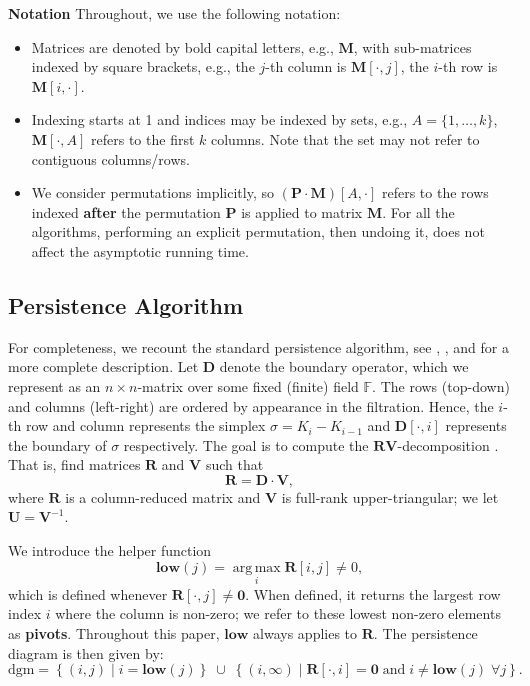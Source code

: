 \documentclass[10pt,a4paper]{article}
\newcommand{\field}{\mathbb{F}}
\newcommand{\matsize}[2]{#1\times #2}
\newcommand{\dgm}{\mathrm{dgm}}
\newcommand{\mat}[1]{\mathbf{#1}}
\newcommand{\bdr}{\mat{D}}
\newcommand{\low}{\mathbf{low}}
\DeclareMathOperator*{\argmax}{arg\,max}
\begin{document}
\vspace{0.2cm}
\noindent\textbf{Notation}
Throughout, we use the following notation:
\begin{itemize}
\item Matrices are denoted by bold capital letters, e.g., $\mat{M}$, with sub-matrices indexed by square brackets, e.g., the $j$-th column is $\mat{M}[\cdot,j]$, the $i$-th row is $\mat{M}[i, \cdot]$. 
\item Indexing starts at 1 and indices may be indexed by sets, e.g., $A = \{1,\ldots,k\}$, $\mat{M}[\cdot,A]$ refers to the first $k$ columns. Note that the set may not refer to contiguous columns/rows.
\item We consider permutations implicitly, so $(\mat{P}\cdot\mat{M})[A,\cdot]$ refers to the rows indexed \textbf{after} the permutation $\mat{P}$ is applied to matrix $\mat{M}$. For all the algorithms, performing an explicit permutation, then undoing it, does not affect the asymptotic running time. %
\end{itemize}

\subsection{Persistence Algorithm}

For completeness, we recount the standard persistence algorithm, see \cite{edelsbrunner2002topological}, \cite{zomorodian2004computing}, and \cite{edelsbrunner2022computational} for a more complete description. Let $\bdr$ denote the boundary operator, which we represent as an $\matsize{n}{n}$-matrix over some fixed (finite) field $\field$. 
%
%
%
The rows (top-down) and columns (left-right) are ordered by appearance in the filtration. Hence, the $i$-th row and column represents the simplex $\sigma = K_i - K_{i-1}$  and $\bdr[\cdot,i]$ represents the boundary of $\sigma$ respectively. 
%
%
The goal is to compute the $\mat{RV}$-decomposition \cite{cohen2006vines}. That
is, find matrices $\mat{R}$ and $\mat{V}$ such that 
\[\mat{R} = \bdr\cdot \mat{V},\]
where $\mat{R}$ is a column-reduced matrix and $\mat{V}$ is full-rank
upper-triangular; we let $\mat{U} = \mat{V}^{-1}$.

We introduce the helper function 
\[\low(j) = 
\argmax\limits_{i} \mat{R}[i,j]\neq 0,  \]
which is defined whenever $\mat{R}[\cdot,j] \neq \mat{0}$.  
When defined, it returns the largest row index $i$ where the column is non-zero; we refer to these lowest
non-zero elements as \textbf{pivots}. Throughout this paper, $\low$ always applies to $\mat{R}$.  The persistence diagram is then given by:
\[\dgm =  \left\{(i,j) \mid
    i = \low(j) \right\}
    \; \cup \;
    \left\{
        (i, \infty) \mid
            \mat{R}[\cdot,i]= \mat{0} \;\mbox{and}\;
            i \neq \low(j) \;\forall j
    \right\}.
    \]
\end{document}

